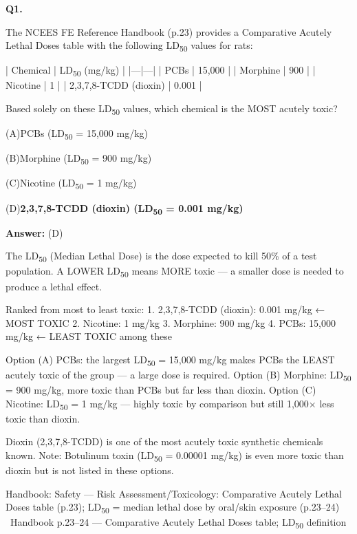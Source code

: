 \documentclass[11pt]{article}
\newcommand{\correct}[1]{\textbf{#1}\;{\color{accent}$\checkmark$}}
\newcommand{\optline}[2]{\par\noindent\hspace{1.2em}(#1)\hspace{0.6em}#2}
\begin{document}
\vspace{10pt}
\filbreak
\textbf{\color{accent}Q1.}\par\vspace{2pt}
The NCEES FE Reference Handbook (p.23) provides a Comparative Acutely Lethal Doses table with the following LD\textsubscript{5}\textsubscript{0} values for rats:

| Chemical | LD\textsubscript{5}\textsubscript{0} (mg/kg) |
|---|---|
| PCBs | 15,000 |
| Morphine | 900 |
| Nicotine | 1 |
| 2,3,7,8-TCDD (dioxin) | 0.001 |

Based solely on these LD\textsubscript{5}\textsubscript{0} values, which chemical is the MOST acutely toxic?\par\vspace{3pt}
\optline{A}{PCBs (LD\textsubscript{5}\textsubscript{0} = 15,000 mg/kg)}
\optline{B}{Morphine (LD\textsubscript{5}\textsubscript{0} = 900 mg/kg)}
\optline{C}{Nicotine (LD\textsubscript{5}\textsubscript{0} = 1 mg/kg)}
\optline{D}{\correct{2,3,7,8-TCDD (dioxin) (LD\textsubscript{5}\textsubscript{0} = 0.001 mg/kg)}}
\par\vspace{3pt}
\vspace{2pt}\par\noindent\colorbox{boxbg}{\parbox{\dimexpr\linewidth-2\fboxsep\relax}{%
\vspace{2pt}\textbf{Answer:} (D)\par\vspace{2pt}
{\small The LD\textsubscript{5}\textsubscript{0} (Median Lethal Dose) is the dose expected to kill 50\% of a test population. A LOWER LD\textsubscript{5}\textsubscript{0} means MORE toxic --- a smaller dose is needed to produce a lethal effect.

Ranked from most to least toxic:
1. 2,3,7,8-TCDD (dioxin): 0.001 mg/kg ← MOST TOXIC
2. Nicotine: 1 mg/kg
3. Morphine: 900 mg/kg
4. PCBs: 15,000 mg/kg ← LEAST TOXIC among these

Option (A) PCBs: the largest LD\textsubscript{5}\textsubscript{0} = 15,000 mg/kg makes PCBs the LEAST acutely toxic of the group --- a large dose is required. Option (B) Morphine: LD\textsubscript{5}\textsubscript{0} = 900 mg/kg, more toxic than PCBs but far less than dioxin. Option (C) Nicotine: LD\textsubscript{5}\textsubscript{0} = 1 mg/kg --- highly toxic by comparison but still 1,000$\times$ less toxic than dioxin.

Dioxin (2,3,7,8-TCDD) is one of the most acutely toxic synthetic chemicals known. Note: Botulinum toxin (LD\textsubscript{5}\textsubscript{0} = 0.00001 mg/kg) is even more toxic than dioxin but is not listed in these options.}\par\vspace{2pt}
{\footnotesize\color{soft}Handbook: Safety --- Risk Assessment/Toxicology: Comparative Acutely Lethal Doses table (p.23); LD\textsubscript{5}\textsubscript{0} = median lethal dose by oral/skin exposure (p.23--24) \textbullet\ Handbook p.23--24 --- Comparative Acutely Lethal Doses table; LD\textsubscript{5}\textsubscript{0} definition}\vspace{2pt}
}}
\end{document}
